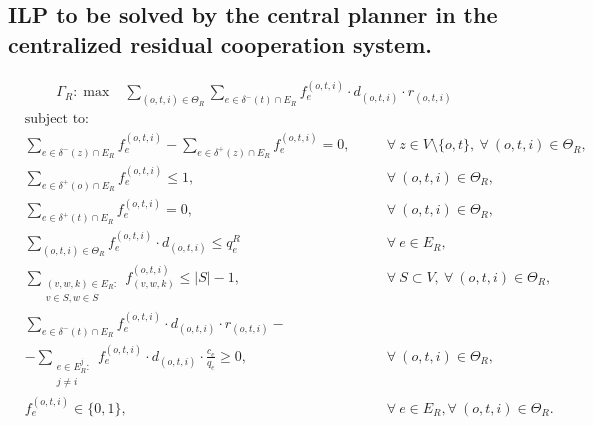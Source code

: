 \documentclass[review]{elsarticle}
\begin{document}
\subsection{ILP to be solved by the central planner in the centralized residual cooperation system.}

  \begin{align}
        &  \Gamma_R: \max  & \sum_{(o,t,i) \in \Theta_R} \sum_{e \in \delta^-(t)\cap E_R}  f_e^{(o,t,i)} \cdot d_{(o,t,i)} \cdot r_{(o,t,i)} &&   
    \end{align}
    \begin{align}
        & \text{subject to:}       && \nonumber\\
        & \sum_{e \in \delta^-(z)\cap E_R} f_e^{(o,t,i)}-\sum_{e \in \delta^+(z)\cap E_R} f_{e}^{(o,t,i)}  = 0,           \quad && \forall\ z\in V\setminus\{o,t\},\ \forall\ (o,t,i)\in\Theta_R, \\[1em]
& \sum_{e \in \delta^+(o)\cap E_R} f_e^{(o,t,i)}\leq 1, && \forall\ (o,t,i)\in \Theta_R,  \\
& \sum_{e \in \delta^+(t)\cap E_R} f_e^{(o,t,i)}  = 0, && \forall\ (o,t,i)\in \Theta_R,  \\
 & \sum_{(o,t,i) \in \Theta_R} f_e^{(o,t,i)}\cdot d_{(o,t,i)} \leq q_e^R   &&\forall\ e \in E_R,   \\
& \sum_{\substack{(v,w,k)\in E_R\colon\\v\in S,w \in S }} f_{(v,w,k)}^{(o,t,i)} \leq |S| -1,  && \forall\ S \subset V, \ \forall\ (o,t,i) \in \Theta_R, \\
& \sum_{e \in \delta^-(t)\cap E_R}  f_e^{(o,t,i)}  \cdot d_{(o,t,i)} \cdot r_{(o,t,i)} - && \nonumber\\
& -\sum_{\substack{e \in E_R^j\colon \\ j\not = i}} f_e^{(o,t,i)} \cdot d_{(o,t,i)} \cdot \frac{c_e}{q_e}\geq 0, && \forall\ (o,t,i) \in \Theta_R, \\
& f_e^{(o,t,i)} \in \{0,1\},    && \forall\ e \in E_R, \forall\ (o,t,i) \in \Theta_R.
    \end{align}
\end{document}
